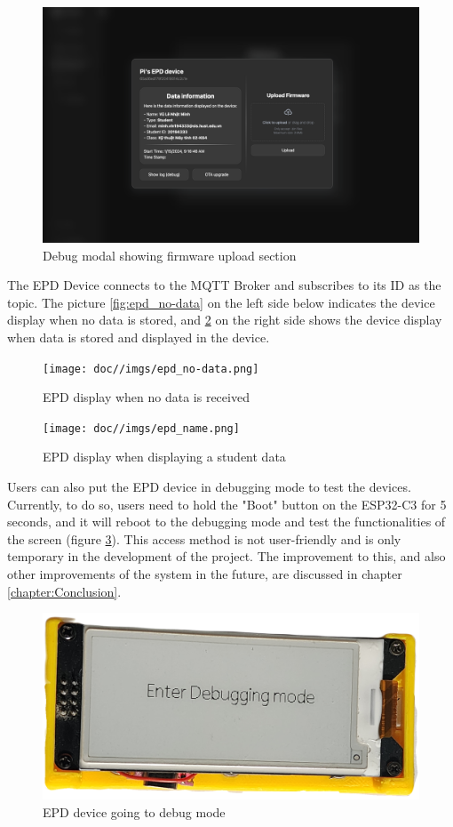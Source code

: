\documentclass[../Main.tex]{subfiles}
\begin{document}
\begin{figure}[H]
    \centering
    \includegraphics[width=0.82\linewidth]{doc//imgs/ui_firmware.png}
    \caption{Debug modal showing firmware upload section}
    \label{fig:ui_firmware}
\end{figure}

The \gls{EPD} Device connects to the MQTT Broker and subscribes to its ID as the topic. The picture \ref{fig:epd_no-data} on the left side below indicates the device display when no data is stored, and \ref{fig:epd_name} on the right side shows the device display when data is stored and displayed in the device. 

\begin{figure}[H]
  \centering
  \begin{minipage}[b]{0.45\textwidth}
    \texttt{[image: doc//imgs/epd\_no-data.png]}
    \caption{EPD display when no data is received}
    \label{fig:epd_no-data}
  \end{minipage}
  \hfill
  \begin{minipage}[b]{0.45\textwidth}
    \texttt{[image: doc//imgs/epd\_name.png]}
    \caption{EPD display when displaying a student data}
    \label{fig:epd_name}
  \end{minipage}
\end{figure}

Users can also put the \gls{EPD} device in debugging mode to test the devices. Currently, to do so, users need to hold the "Boot" button on the ESP32-C3 for 5 seconds, and it will reboot to the debugging mode and test the functionalities of the screen (figure \ref{fig:epd_debug}). This access method is not user-friendly and is only temporary in the development of the project. The improvement to this, and also other improvements of the system in the future, are discussed in chapter \ref{chapter:Conclusion}.

\begin{figure}[H]
    \centering
    \includegraphics[width=0.7\linewidth]{doc//imgs/epd_debug.png}
    \caption{EPD device going to debug mode}
    \label{fig:epd_debug}
\end{figure}
\end{document}
